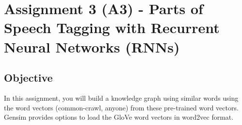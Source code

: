             \section{Assignment 3 (A3) - Parts of Speech Tagging with Recurrent Neural Networks (RNNs)}


\subsection{Objective}
In this assignment, you will build a knowledge graph using similar words using the word vectors (common-crawl, anyone) from these pre-trained word vectors. Gensim provides options to load the GloVe word vectors in word2vec format.


